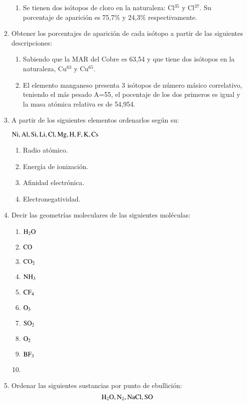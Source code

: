 \begin{enumerate}
\begin{enumerate}
    \item Se tienen dos isótopos de cloro en la naturaleza: Cl$^{35}$ y Cl$^{37}$. Su porcentaje de aparición es 75,7\% y 24,3\% respectivamente.
\end{enumerate}


\item Obtener los porcentajes de aparición de cada isótopo a partir de las siguientes descripciones:
\begin{enumerate}
    \item Sabiendo que la MAR del Cobre es 63,54 y que tiene dos isótopos en la naturaleza, Cu$^{63}$ y Cu$^{65}$.

    \item El elemento manganeso presenta 3 isótopos de número másico correlativo, teniendo el más pesado A=55, el pocentaje de los dos primeros es igual y la masa atómica relativa es de 54,954.
\end{enumerate}


\item A partir de los siguientes elementos ordenarlos según su:

\hfil$\ce{Ni, Al, Si, Li, Cl, Mg, H, F, K, Cs}$\hfil

\begin{enumerate}
    \item Radio atómico.
    \item Energía de ionización.
    \item Afinidad electrónica.
    \item Electronegatividad.
\end{enumerate}


\item Decir las geometrías moleculares de las siguientes moléculas:
\begin{multicols}{2}
\begin{enumerate}
    \item $\ce{H2O}$
    \item $\ce{CO}$
    \item $\ce{CO2}$
    \item $\ce{NH3}$
    \item $\ce{CF4}$
    \item $\ce{O3}$
    \item $\ce{SO2}$
    \item $\ce{O2}$
    \item $\ce{BF3}$
    \item[]
\end{enumerate}
\end{multicols}


\item Ordenar las siguientes sustancias por punto de ebullición:
$$\ce{H2O, N2, NaCl, SO}$$


\end{enumerate}
